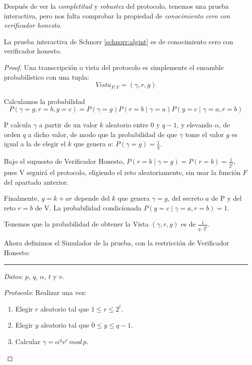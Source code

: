 \hfil



Después de ver la \textit{completitud} y \textit{robustez} del protocolo, tenemos una prueba interactiva, pero nos falta comprobar la propiedad de \textit{conocimiento cero con verificador honesto}.

\begin{theorem}
	La prueba interactiva de Schnorr \ref{schnorr:algint} es de conocimiento cero con verificador honesto.
\end{theorem}

\begin{proof}


Una transcripción o vista del protocolo es simplemente el ensamble probabilístico con una tupla:
\[
Vista_{P,V} =(\gamma, r, y)
\]

Calculamos la probabilidad 
\[
P(\gamma=g, r=b, y=c) = P(\gamma=g)P(r=b\mid \gamma =a)P(y=c\mid \gamma=a, r=b)
\]


P calcula $\gamma$ a partir de un valor $k$ aleatorio entre $0$ y $q-1$, y elevando $\alpha$, de orden $q$ a dicho valor, de modo que la probabilidad de que $\gamma$ tome el valor $g$ es igual a la de elegir el $k$ que genera $a$: $P(\gamma=g)=\frac{1}{q}$.

Bajo el supuesto de Verificador Honesto, $P(r=b\mid \gamma =g)=P(r=b)=\frac{1}{2^t}$, pues V seguirá el protocolo, eligiendo el reto aleatoriamente, sin usar la función $F$ del apartado anterior.

Finalmente, $y=k+ar$ depende del $k$ que genera $\gamma=g$, del secreto $a$ de P y del reto $r=b$ de V. La probabilidad condicionada $P(y=c\mid \gamma=a, r=b)=1$.

Tenemos que la probabilidad de obtener la Vista $(\gamma, r, y)$ es de $\frac{1}{q\cdot 2^{t}}$.

\hfil

Ahora definimos el Simulador de la prueba, con la restricción de Verificador Honesto:


\rule{\textwidth}{1pt}
\begin{algorithm}
	
	\hfil
	
	\textit{Datos}: $p$, $q$, $\alpha$, $t$ y $v$.
	
	\textit{Protocolo}: Realizar una vez:
	
	\begin{enumerate}
		
		\item Elegir $r$ aleatorio tal que $1\leq r \leq 2^t$.
		\item Elegir $y$ aleatorio tal que $0\leq y \leq q-1$.
		\item Calcular $\gamma = \alpha ^y v^r \, mod \, p$.		
		

\end{enumerate}
\end{algorithm}
\end{proof}
